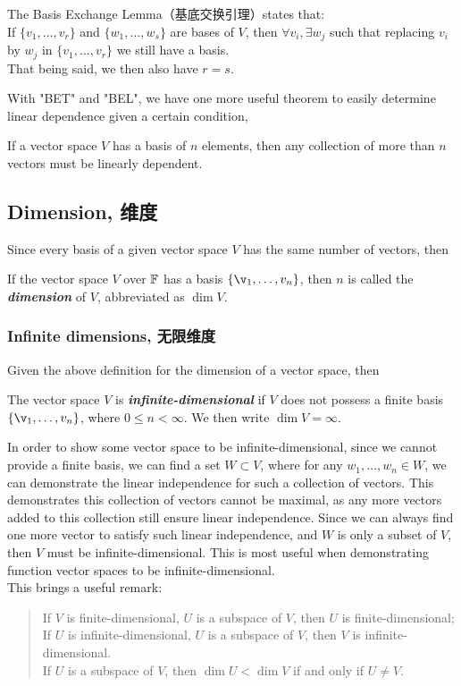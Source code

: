 \begin{lemma}
    The Basis Exchange Lemma（基底交换引理）states that: \\
    If $\{v_1, \dots, v_r\}$ and $\{w_1, \dots, w_s\}$ are bases of $V$, then $\forall v_i, \exists w_j$ such that replacing $v_i$ by $w_j$ in $\{v_1, \dots, v_r\}$ we still have a basis. \\
    That being said, we then also have $r=s$.
\end{lemma}
With "BET" and "BEL", we have one more useful theorem to easily determine linear dependence given a certain condition,
\begin{theorem}
    If a vector space $V$ has a basis of $n$ elements, then any collection of more than $n$ vectors must be linearly dependent.
\end{theorem}
\newpage

\subsection{Dimension, 维度}
Since every basis of a given vector space $V$ has the same number of vectors, then
\begin{definition}
    If the vector space $V$ over $\mathbb{F}$ has a basis $\{\v_1, \dots, v_n\}$, then $n$ is called the \textbf{\textit{dimension}} of $V$, abbreviated as $\dim V$.
\end{definition}
\subsubsection{Infinite dimensions, 无限维度}
Given the above definition for the dimension of a vector space, then
\begin{definition}
    The vector space $V$ is \textbf{\textit{infinite-dimensional}} if $V$ does not possess a finite basis $\{\v_1, \dots, v_n\}$, where $0\le n < \infty$. We then write $\dim V = \infty$.
\end{definition}
In order to show some vector space to be infinite-dimensional, since we cannot provide a finite basis, we can find a set $W \subset V$, where for any $w_1, \dots, w_n \in W$, we can demonstrate the linear independence for such a collection of vectors. This demonstrates this collection of vectors cannot be maximal, as any more vectors added to this collection still ensure linear independence. Since we can always find one more vector to satisfy such linear independence, and $W$ is only a subset of $V$, then $V$ must be infinite-dimensional. This is most useful when demonstrating function vector spaces to be infinite-dimensional. \\
This brings a useful remark:
\begin{quote}
    If $V$ is finite-dimensional, $U$ is a subspace of $V$, then $U$ is finite-dimensional; \\
    If $U$ is infinite-dimensional, $U$ is a subspace of $V$, then $V$ is infinite-dimensional. \\
    If $U$ is a subspace of $V$, then $\dim U < \dim V$ if and only if $U \ne V$.
\end{quote}

